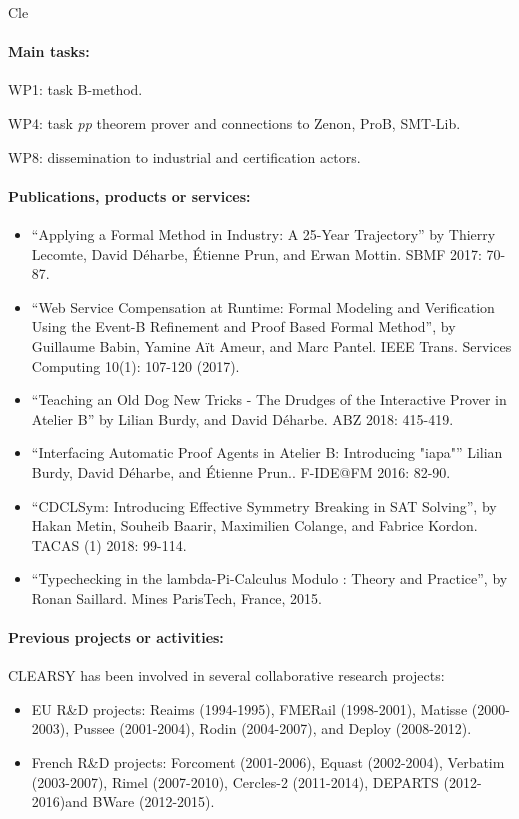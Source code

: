 \begin{sitedescription}{Cle}
\paragraph{Main tasks:}

\begin{compactitem}
\item WP1: task B-method.
\item WP4: task \emph{pp} theorem prover and connections to Zenon, ProB, SMT-Lib.
\item WP8: dissemination to industrial and certification actors.
\end{compactitem}


\paragraph{Publications, products or services:}

\begin{itemize}
\item ``Applying a Formal Method in Industry: A 25-Year Trajectory'' by Thierry Lecomte, David Déharbe, Étienne Prun, and Erwan Mottin.
SBMF 2017: 70-87.
\item ``Web Service Compensation at Runtime: Formal Modeling and Verification Using the Event-B Refinement and Proof Based Formal Method'', by Guillaume Babin, Yamine Aït Ameur, and Marc Pantel. IEEE Trans. Services Computing 10(1): 107-120 (2017).
\item ``Teaching an Old Dog New Tricks - The Drudges of the Interactive Prover in Atelier B'' by Lilian Burdy, and David Déharbe. ABZ 2018: 415-419.
\item ``Interfacing Automatic Proof Agents in Atelier B: Introducing "iapa"'' Lilian Burdy, David Déharbe, and Étienne Prun.. F-IDE@FM 2016: 82-90.
\item ``CDCLSym: Introducing Effective Symmetry Breaking in SAT Solving'', by Hakan Metin, Souheib Baarir, Maximilien Colange, and Fabrice Kordon. TACAS (1) 2018: 99-114.
\item ``Typechecking in the lambda-Pi-Calculus Modulo : Theory and Practice'', by Ronan Saillard. Mines ParisTech, France, 2015.
\end{itemize}

\paragraph{Previous projects or activities:}

CLEARSY has been involved in several collaborative research projects:
\begin{itemize}
\item EU R\&D projects: Reaims (1994-1995), FMERail (1998-2001), Matisse (2000-2003), Pussee (2001-2004), Rodin (2004-2007), and Deploy (2008-2012).
\item French R\&D projects: Forcoment (2001-2006), Equast (2002-2004), Verbatim (2003-2007), Rimel (2007-2010), Cercles-2 (2011-2014), DEPARTS (2012-2016)and BWare (2012-2015).
\end{itemize}


\end{sitedescription}
